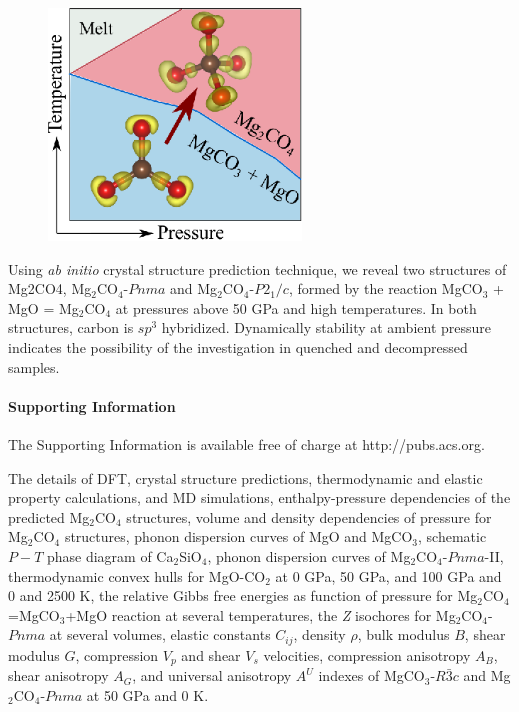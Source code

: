 \documentclass[a4paperm]{article}
\begin{document}
\begin{figure}[H]
\includegraphics[width=0.6\textwidth]{toc_mg2co4} \centering

\end{figure}

Using {\it ab initio} crystal structure prediction technique, we reveal two structures of Mg2CO4,  Mg$_2$CO$_4$-$Pnma$ and  Mg$_2$CO$_4$-$P2_1/c$, formed by the reaction MgCO$_3$ + MgO = Mg$_2$CO$_4$ at pressures above 50 GPa and high temperatures.
In both structures, carbon is $sp^3$ hybridized.
Dynamically stability at ambient pressure indicates the possibility of the investigation in quenched and decompressed samples. 

\paragraph{Supporting Information}

The Supporting Information is available free of charge at http://pubs.acs.org.

The details of DFT, crystal structure predictions, thermodynamic and elastic property calculations, and MD simulations, enthalpy-pressure dependencies of the predicted Mg$_2$CO$_4$ structures, volume and density dependencies of pressure for Mg$_2$CO$_4$ structures, phonon dispersion curves of MgO and MgCO$_3$, schematic $P-T$ phase diagram of Ca$_2$SiO$_4$, phonon dispersion curves of Mg$_2$CO$_4$-$Pnma$-II, thermodynamic convex hulls for MgO-CO$_2$ at 0 GPa, 50 GPa, and 100 GPa and 0 and 2500 K, the relative Gibbs free energies as function of pressure for Mg$_2$CO$_4$=MgCO$_3$+MgO reaction at several temperatures, the {\it Z} isochores for Mg$_2$CO$_4$-$Pnma$ at several volumes, elastic constants $C_{ij}$, density $\rho$, bulk modulus $B$, shear modulus $G$, compression $V_p$ and shear $V_s$ velocities, compression anisotropy $A_B$, shear anisotropy $A_G$, and universal anisotropy $A^U$ indexes of MgCO$_3$-$R\bar{3}c$ and Mg$_2$CO$_4$-$Pnma$ at 50 GPa and 0 K. 
\end{document}
